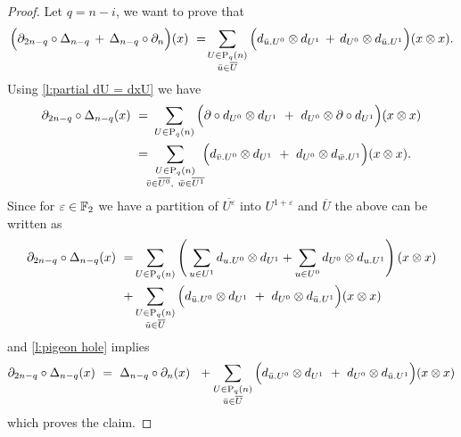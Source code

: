 \begin{proof}
	Let $q = n-i$, we want to prove that
	\begin{equation*}
	\Big( \partial_{2n-q} \circ \Delta_{n - q} \, +\, \Delta_{n-q} \circ \partial_n \Big) (x) \ = \! 
	\sum_{\substack{U \in \mathrm{P}_{q}(n) \\ {\bar{u}} \in \overline{U}}} \Big( d_{{\bar{u}}.U^0} \otimes d_{U^1} \, + \, d_{U^0} \otimes d_{{\bar{u}}.U^1} \Big) (x \otimes x).
	\end{equation*}
	Using \cref{l:partial dU = dxU} we have
	\begin{equation*}
	\begin{split}
	\partial_{2n-q} \circ \Delta_{n - q} (x) \ = & \
	\sum_{U \in \P_q(n)} \Big( \partial \circ d_{U^0} \otimes d_{U^1}\ +\
	d_{U^0} \otimes \partial \circ d_{U^1} \Big) (x \otimes x) \\ = & \!\!
	\sum_{\substack{U \in \P_q(n) \\ \bar v \in \overline{U^0},\ \bar w \in \overline{U^1} } }\!\! \Big( d_{\bar v.U^0} \otimes d_{U^1}\ +\ d_{U^0} \otimes d_{\bar w.U^1}\Big) (x \otimes x).
	\end{split}
	\end{equation*}
	Since for $\varepsilon \in \mathbb{F}_2$ we have a partition of $\overline{U^\varepsilon}$ into $U^{1+\varepsilon}$ and $\overline{U}$ the above can be written as
	\begin{align*}
	\partial_{2n-q} \circ \Delta_{n - q} (x) \ = &
	\sum_{U \in \mathrm{P}_q(n)} \left( \,
	\sum_{u \in U^1} d_{u.U^0} \otimes d_{U^1} + 
	\sum_{u \in U^0} d_{U^0} \otimes d_{u.U^1} \right)(x \otimes x) \\ + & 
	\sum_{\substack{U\in\mathrm{P}_{q}(n) \\ {\bar{u}} \in \overline{U}}} \Big( d_{{\bar{u}}.U^0} \otimes d_{U^1}\ +\ d_{U^0} \otimes d_{{\bar{u}}.U^1}\Big) (x \otimes x)
	\end{align*}
	and \cref{l:pigeon hole} implies	
	\begin{align*}
	\partial_{2n-q} \circ \Delta_{n - q} (x) \ = \
	\Delta_{n-q} \circ \partial_n (x) \ \  +
	\sum_{\substack{U\in\mathrm{P}_{q}(n) \\ {\bar{u}} \in \overline{U}}} \Big( d_{{\bar{u}}.U^0} \otimes d_{U^1}\ +\ d_{U^0} \otimes d_{{\bar{u}}.U^1}\Big) (x \otimes x)
	\end{align*}
	which proves the claim.
\end{proof}

